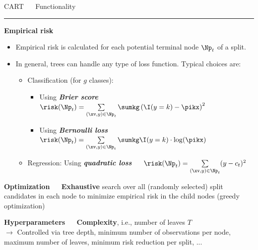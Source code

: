 \documentclass[11pt,compress,t,notes=noshow, xcolor=table]{beamer}
\begin{document}

\LARGE
\begin{frame}{\textcolor{gray!80}{CART} ~~ Functionality}
\normalsize
\vspace{-0.5cm}
\noindent \textcolor{gray!80}{\rule{\textwidth}{1pt}}

\vspace{0.3cm}

\footnotesize

\textbf{\textcolor{gray!80}{Empirical risk}} \\

\begin{itemize}
  \item Empirical risk is calculated for each potential terminal node $\Np_t$
  of a split.
  \item In general, trees can handle any type of loss function. Typical choices
  are:
  \begin{itemize}
    \footnotesize
    \item Classification (for $g$ classes):
    \begin{itemize}
      \footnotesize
      \item Using \textit{\textbf{Brier score}} ~~
      $\risk(\Np_t) = \sum\limits_{(\xv,y) \in \Np_t} \sumkg \left( \I(y = k)
      - \pikx \right)^2$
      \item Using \textit{\textbf{Bernoulli loss}} ~~
      $\risk(\Np_t) = \sum\limits_{(\xv,y) \in \Np_t} \sumkg \I(y = k) \cdot
      \log(\pikx)$
    \end{itemize}
    \item Regression: Using \textit{\textbf{quadratic loss}} ~~
    $\risk(\Np_t) = \sum\limits_{(\xv,y) \in \Np_t} (y - c_t)^2$
  \end{itemize}
\end{itemize}

\medskip

\textbf{\textcolor{gray!80}{Optimization}} ~~ \textbf{Exhaustive} search over
all (randomly selected) split candidates in each node to minimize empirical risk 
in the child nodes (greedy optimization) \\

\medskip

\textbf{\textcolor{gray!80}{Hyperparameters}} ~~ \textbf{Complexity}, i.e., 
number of leaves $T$ \\
$\rightarrow$ Controlled via tree depth, minimum number of observations per 
node, maximum number of leaves, minimum risk reduction per split, ...

\normalsize
  
\end{frame}
\end{document}
